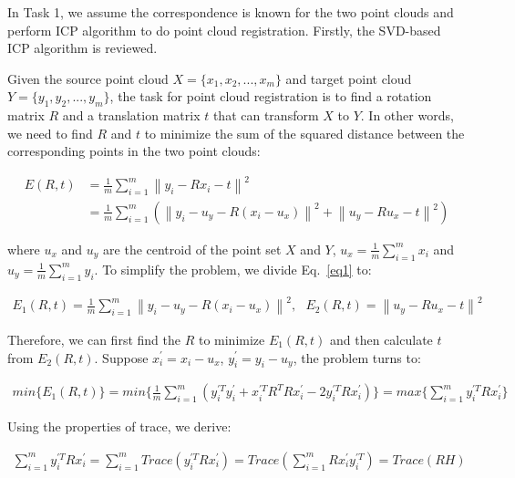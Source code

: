 \documentclass[hyperref]{article}
\theoremstyle{nonumberplain}
\begin{document}
In Task 1, we assume the correspondence is known for the two point clouds and perform ICP algorithm to do point cloud registration. Firstly, the SVD-based ICP algorithm is reviewed. 

Given the source point cloud $X=\{x_{1}, x_{2}, ..., x_{m}\}$ and target point cloud $Y=\{y_{1}, y_{2}, ..., y_{m}\}$, the task for point cloud registration is to find a rotation matrix $R$ and a translation matrix $t$ that can transform $X$ to $Y$. In other words, we need to find $R$ and $t$ to minimize the sum of the squared distance between the corresponding points in the two point clouds:

\begin{equation}
\begin{aligned}
E(R,t)&=\frac{1}{m}\sum_{i=1}^{m}\left \| y_{i}-Rx_{i}-t \right \|^{2}\\
&=\frac{1}{m}\sum_{i=1}^{m}(\left \| y_{i}-u_{y}-R(x_{i}-u_{x})\right \|^{2}+\left \| u_{y}-Ru_{x}-t\right \|^{2})
\label{eq1}
\end{aligned}
\end{equation}

where $u_{x}$ and $u_{y}$ are the centroid of the point set $X$ and $Y$, $u_{x}=\frac{1}{m}\sum_{i=1}^{m}x_{i}$ and $u_{y}=\frac{1}{m}\sum_{i=1}^{m}y_{i}$. To simplify the problem, we divide Eq.~\ref{eq1} to:

\begin{equation}
\begin{aligned}
E_{1}(R,t)=\frac{1}{m}\sum_{i=1}^{m}\left \| y_{i}-u_{y}-R(x_{i}-u_{x})\right \|^{2}, \ \ \
E_{2}(R,t)=\left \| u_{y}-Ru_{x}-t  \right \|^{2}
\label{eq2}
\end{aligned}
\end{equation}

Therefore, we can first find the $R$ to minimize $E_{1}(R,t)$ and then calculate $t$ from $E_{2}(R,t)$. Suppose $x_{i}^{'}=x_{i}-u_{x}$, $y_{i}^{'}=y_{i}-u_{y}$, the problem turns to:

\begin{equation}
\begin{aligned}
min\{E_{1}(R,t)\}=min\{\frac{1}{m}\sum_{i=1}^{m}(y_{i}^{'T}y_{i}^{'}+x_{i}^{'T}R^{T}Rx_{i}^{'}-2y_{i}^{'T}Rx_{i}^{'})\} = max \{\sum_{i=1}^{m}y_{i}^{'T}Rx_{i}^{'}\}
\label{eq3}
\end{aligned}
\end{equation}

Using the properties of trace, we derive:

\begin{equation}
\begin{aligned}
\sum_{i=1}^{m}y_{i}^{'T}Rx_{i}^{'}=\sum_{i=1}^{m}Trace(y_{i}^{'T}Rx_{i}^{'})=Trace(\sum_{i=1}^{m}Rx_{i}^{'}y_{i}^{'T})=Trace(RH)
\label{eq4}
\end{aligned}
\end{equation}
\end{document}

